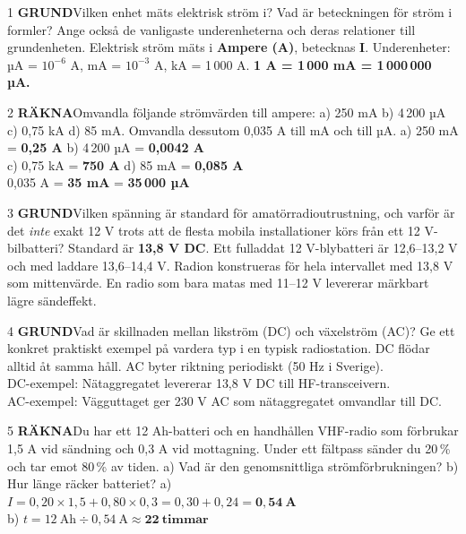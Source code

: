 \documentclass[a4paper,11pt,twoside]{book}
\newcommand{\qgrund}{\colorbox{greenpale}{\textcolor{greendark}{\headingfont\bfseries\tiny GRUND}}}
\newcommand{\qrakna}{\colorbox{bluepale}{\textcolor{bluedark}{\headingfont\bfseries\tiny RÄKNA}}}
\begin{document}
\begin{facitblock}{1}
\qgrund\quad Vilken enhet mäts elektrisk ström i? Vad är beteckningen 
för ström i formler? Ange också de vanligaste underenheterna och deras 
relationer till grundenheten.
\tcblower
Elektrisk ström mäts i \textbf{Ampere (A)}, betecknas \textbf{I}. 
Underenheter: µA = $10^{-6}$ A, mA = $10^{-3}$ A, kA = 1\,000 A. 
\textbf{1 A = 1\,000 mA = 1\,000\,000 µA.}
\end{facitblock}

\begin{facitblock}{2}
\qrakna\quad Omvandla följande strömvärden till ampere: a) 250 mA 
\quad b) 4\,200 µA \quad c) 0,75 kA \quad d) 85 mA. Omvandla 
dessutom 0,035 A till mA och till µA.
\tcblower
a) 250 mA = \textbf{0,25 A} \quad b) 4\,200 µA = \textbf{0,0042 A}\\
c) 0,75 kA = \textbf{750 A} \quad d) 85 mA = \textbf{0,085 A}\\
0,035 A = \textbf{35 mA} = \textbf{35\,000 µA}
\end{facitblock}

\begin{facitblock}{3}
\qgrund\quad Vilken spänning är standard för amatörradioutrustning, 
och varför är det \emph{inte} exakt 12 V trots att de flesta mobila 
installationer körs från ett 12 V-bilbatteri?
\tcblower
Standard är \textbf{13,8 V DC}. Ett fulladdat 12 V-blybatteri är 
12,6–13,2 V och med laddare 13,6–14,4 V. Radion konstrueras för 
hela intervallet med 13,8 V som mittenvärde. En radio som bara matas med 11–12 V levererar märkbart lägre sändeffekt.
\end{facitblock}

\begin{facitblock}{4}
\qgrund\quad Vad är skillnaden mellan likström (DC) och växelström 
(AC)? Ge ett konkret praktiskt exempel på vardera typ i en typisk 
radiostation.
\tcblower
DC flödar alltid åt samma håll. AC byter riktning periodiskt 
(50 Hz i Sverige).\\
DC-exempel: Nätaggregatet levererar 13,8 V DC till HF-transceivern.\\
AC-exempel: Vägguttaget ger 230 V AC som nätaggregatet omvandlar 
till DC.
\end{facitblock}

\begin{facitblock}{5}
\qrakna\quad Du har ett 12 Ah-batteri och en handhållen VHF-radio 
som förbrukar 1,5 A vid sändning och 0,3 A vid mottagning. Under 
ett fältpass sänder du 20\,\% och tar emot 80\,\% av tiden. 
a) Vad är den genomsnittliga strömförbrukningen? 
b) Hur länge räcker batteriet?
\tcblower
a) $I = 0{,}20 \times 1{,}5 + 0{,}80 \times 0{,}3 = 0{,}30 + 0{,}24 
= \mathbf{0{,}54\ A}$\\
b) $t = 12\ \text{Ah} \div 0{,}54\ \text{A} \approx 
\mathbf{22\ \text{timmar}}$
\end{facitblock}
\end{document}
